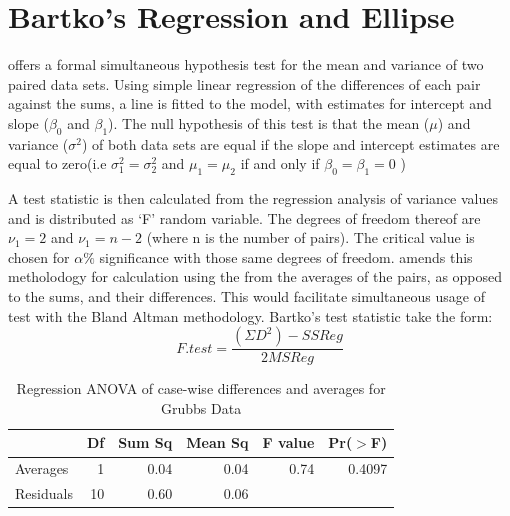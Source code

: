 \documentclass[12pt, a4paper]{report}
\theoremstyle{plain}
\theoremstyle{definition}
\theoremstyle{remark}
\begin{document}
		

		
	\section{Bartko's Regression and Ellipse}
	\citet{BB89} offers a formal simultaneous hypothesis test for the
	mean and variance of two paired data sets. Using simple linear
	regression of the differences of each pair against the sums, a
	line is fitted to the model, with estimates for intercept and
	slope ($\beta_{0}$ and $\beta_{1}$). The null hypothesis of this
	test is that the mean ($\mu$) and variance ($\sigma^{2}$) of both
	data sets are equal if the slope and intercept estimates are equal
	to zero(i.e $\sigma^{2}_{1} = \sigma^{2}_{2}$ and
	$\mu_{1}=\mu_{2}$ if and only if $\beta_{0}= \beta_{1}=0$ )
	
	A test statistic is then calculated from the regression analysis
	of variance values \citep{BB89} and is distributed as `F' random
	variable. The degrees of freedom thereof are $\nu_{1}=2$ and
	$\nu_{1}=n-2$ (where n is the number of pairs). The critical value
	is chosen for $\alpha\%$ significance with those same degrees of
	freedom. \citet{Bartko} amends this metholodogy for calculation
	using the from the averages of the pairs, as opposed to the sums,
	and their differences. This would facilitate simultaneous usage of
	test with the Bland Altman methodology. Bartko's test statistic
	take the form:
	\begin{equation} F.test = \frac{(\Sigma D^{2})-SSReg}{2MSReg}
	\end{equation}
	
	\newpage
	
	\begin{table}[ht]
		\begin{center}
			\begin{tabular}{lrrrrr}
				\hline
				& Df & Sum Sq & Mean Sq & F value & Pr($>$F) \\
				\hline
				Averages & 1 & 0.04 & 0.04 & 0.74 & 0.4097 \\
				Residuals & 10 & 0.60 & 0.06 &  &  \\
				\hline
			\end{tabular}
			\caption{Regression ANOVA of case-wise differences and averages
				for Grubbs Data}
		\end{center}
	\end{table}
	
\end{document}
